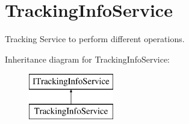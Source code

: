 \hypertarget{classWildLifeTracker_1_1Services_1_1TrackingInfoService}{}\section{Tracking\+Info\+Service}
\label{classWildLifeTracker_1_1Services_1_1TrackingInfoService}


Tracking Service to perform different operations.  


Inheritance diagram for Tracking\+Info\+Service\+:\begin{figure}[H]
\begin{center}
\leavevmode
\includegraphics[height=2.000000cm]{classWildLifeTracker_1_1Services_1_1TrackingInfoService}
\end{center}
\end{figure}
